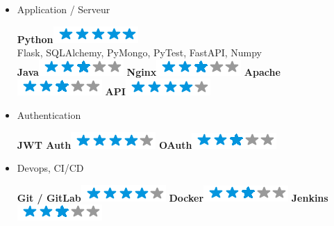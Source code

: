 \documentclass[]{friggeri-cv}
\begin{document}
\begin{flushright}
\begin{multicols}{3}
\begin{itemize}
\columnbreak
\item Application / Serveur \
\begin{flushright}

\textbf{Python}\includegraphics[scale=0.40]{res/img/5stars.png}\\Flask, SQLAlchemy, PyMongo, PyTest, FastAPI, Numpy\\\vspace{2mm}
\textbf{Java}\includegraphics[scale=0.40]{res/img/3stars.png}
\textbf{Nginx}\includegraphics[scale=0.40]{res/img/3stars.png}
\textbf{Apache}\includegraphics[scale=0.40]{res/img/3stars.png}
\textbf{API}\includegraphics[scale=0.40]{res/img/4stars.png}
\end{flushright}            

\item Authentication \
\begin{flushright}

\textbf{JWT Auth}\includegraphics[scale=0.40]{res/img/4stars.png}
\textbf{OAuth}\includegraphics[scale=0.40]{res/img/3stars.png}
\end{flushright}            

\item Devops, CI/CD \
\begin{flushright}

\textbf{Git / GitLab}\includegraphics[scale=0.40]{res/img/4stars.png}
\textbf{Docker}\includegraphics[scale=0.40]{res/img/3stars.png}
\textbf{Jenkins}\includegraphics[scale=0.40]{res/img/3stars.png}
\end{flushright}            


\end{itemize}
\end{multicols}
\end{flushright}
\end{document}
